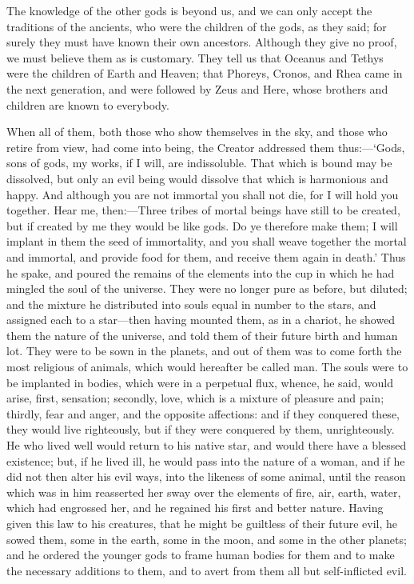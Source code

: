 The knowledge of the other gods is beyond us, and we can only accept the
traditions of the ancients, who were the children of the gods, as they
said; for surely they must have known their own ancestors. Although they
give no proof, we must believe them as is customary. They tell us that
Oceanus and Tethys were the children of Earth and Heaven; that Phoreys,
Cronos, and Rhea came in the next generation, and were followed by Zeus
and Here, whose brothers and children are known to everybody.

When all of them, both those who show themselves in the sky, and those who
retire from view, had come into being, the Creator addressed them thus:—‘Gods,
sons of gods, my works, if I will, are indissoluble. That which is bound
may be dissolved, but only an evil being would dissolve that which is
harmonious and happy. And although you are not immortal you shall not die,
for I will hold you together. Hear me, then:—Three tribes of mortal
beings have still to be created, but if created by me they would be like
gods. Do ye therefore make them; I will implant in them the seed of
immortality, and you shall weave together the mortal and immortal, and
provide food for them, and receive them again in death.’ Thus he spake,
and poured the remains of the elements into the cup in which he had
mingled the soul of the universe. They were no longer pure as before, but
diluted; and the mixture he distributed into souls equal in number to the
stars, and assigned each to a star—then having mounted them, as in a
chariot, he showed them the nature of the universe, and told them of their
future birth and human lot. They were to be sown in the planets, and out
of them was to come forth the most religious of animals, which would
hereafter be called man. The souls were to be implanted in bodies, which
were in a perpetual flux, whence, he said, would arise, first, sensation;
secondly, love, which is a mixture of pleasure and pain; thirdly, fear and
anger, and the opposite affections: and if they conquered these, they
would live righteously, but if they were conquered by them, unrighteously.
He who lived well would return to his native star, and would there have a
blessed existence; but, if he lived ill, he would pass into the nature of
a woman, and if he did not then alter his evil ways, into the likeness of
some animal, until the reason which was in him reasserted her sway over
the elements of fire, air, earth, water, which had engrossed her, and he
regained his first and better nature. Having given this law to his
creatures, that he might be guiltless of their future evil, he sowed them,
some in the earth, some in the moon, and some in the other planets; and he
ordered the younger gods to frame human bodies for them and to make the
necessary additions to them, and to avert from them all but self-inflicted
evil.

